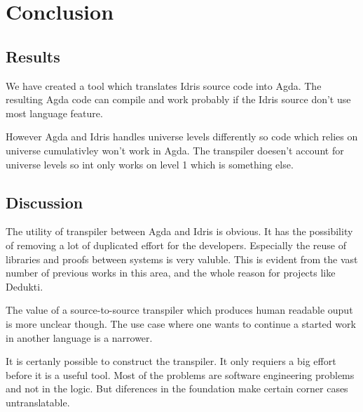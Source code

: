 \chapter{Conclusion}





\section{Results}

We have created a tool which translates Idris source code into Agda. The
resulting Agda code can compile and work probably if the Idris source don't use
most language feature.

However Agda and Idris handles universe levels differently so code which relies
on universe cumulativley won't work in Agda. The transpiler doesen't account
for universe levels so int only works on level 1 which is something else.


\section{Discussion}
The utility of transpiler between Agda and Idris is obvious. It has the
possibility of removing a lot of duplicated effort for the developers.
Especially the reuse of libraries and proofs between systems is very valuble.
This is evident from the vast number of previous works in this area, and the
whole reason for projects like Dedukti.~\cite{assaf2016dedukti}

The value of a source-to-source transpiler which produces human readable ouput
is more unclear though. The use case where one wants to continue a started work
in another language is a narrower.

It is certanly possible to construct the transpiler. It only requiers a big
effort before it is a useful tool. Most of the problems are software
engineering problems and not in the logic. But diferences in the foundation
make certain corner cases untranslatable.

